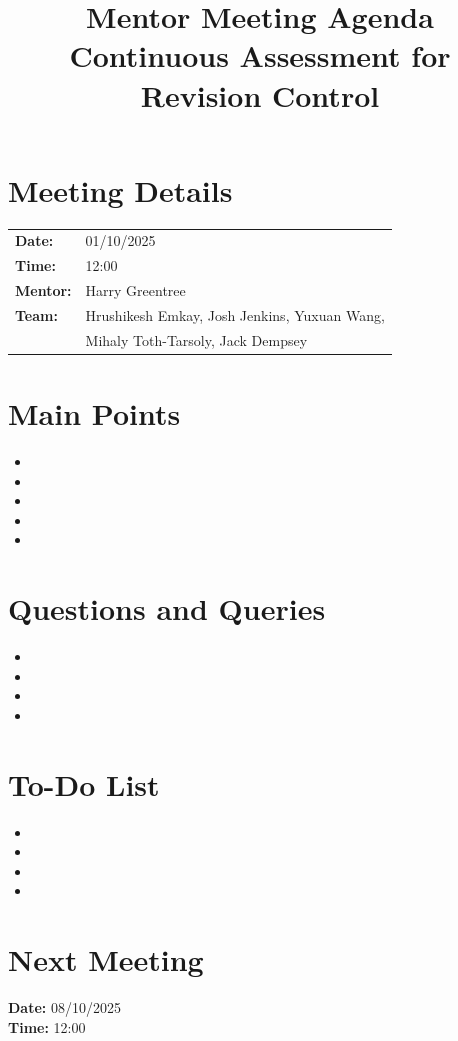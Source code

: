 \documentclass[11pt,a4paper]{article}
\title{\textbf{Mentor Meeting Agenda\\Continuous Assessment for Revision Control}}
\date{}
\begin{document}
\maketitle

\section*{Meeting Details}
\begin{tabular}{ll}
\textbf{Date:} & 01/10/2025 \\
\textbf{Time:} & 12:00 \\
\textbf{Mentor:} & Harry Greentree \\
\textbf{Team:} & Hrushikesh Emkay, Josh Jenkins, Yuxuan Wang, \\
& Mihaly Toth-Tarsoly, Jack Dempsey \\
\end{tabular}

\vspace{1em}

\section*{Main Points}
\begin{itemize}
    \item 
    \item 
    \item 
    \item 
    \item 
\end{itemize}

\vspace{1em}

\section*{Questions and Queries}
\begin{itemize}
    \item 
    \item 
    \item 
    \item 
\end{itemize}

\vspace{1em}

\section*{To-Do List}
\begin{itemize}
    \item 
    \item 
    \item 
    \item 
\end{itemize}

\vspace{1em}

\section*{Next Meeting}
\textbf{Date:} 08/10/2025 \\
\textbf{Time:} 12:00
\end{document}
